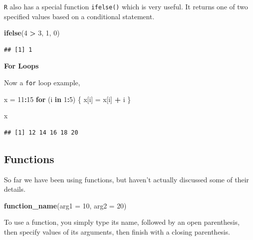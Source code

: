 \documentclass[]{book}
\newenvironment{Shaded}{\begin{snugshade}}{\end{snugshade}}
\newcommand{\KeywordTok}[1]{\textcolor[rgb]{0.13,0.29,0.53}{\textbf{#1}}}
\newcommand{\DataTypeTok}[1]{\textcolor[rgb]{0.13,0.29,0.53}{#1}}
\newcommand{\DecValTok}[1]{\textcolor[rgb]{0.00,0.00,0.81}{#1}}
\newcommand{\StringTok}[1]{\textcolor[rgb]{0.31,0.60,0.02}{#1}}
\newcommand{\ControlFlowTok}[1]{\textcolor[rgb]{0.13,0.29,0.53}{\textbf{#1}}}
\newcommand{\OperatorTok}[1]{\textcolor[rgb]{0.81,0.36,0.00}{\textbf{#1}}}
\newcommand{\NormalTok}[1]{#1}
\theoremstyle{definition}
\theoremstyle{definition}
\theoremstyle{definition}
\theoremstyle{remark}
\begin{document}
\texttt{R} also has a special function \texttt{ifelse()} which is very
useful. It returns one of two specified values based on a conditional
statement.

\begin{Shaded}
\begin{Highlighting}[]
\KeywordTok{ifelse}\NormalTok{(}\DecValTok{4} \OperatorTok{>}\StringTok{ }\DecValTok{3}\NormalTok{, }\DecValTok{1}\NormalTok{, }\DecValTok{0}\NormalTok{)}
\end{Highlighting}
\end{Shaded}

\begin{verbatim}
## [1] 1
\end{verbatim}

\textbf{For Loops}

Now a \texttt{for} loop example,

\begin{Shaded}
\begin{Highlighting}[]
\NormalTok{x =}\StringTok{ }\DecValTok{11}\OperatorTok{:}\DecValTok{15}
\ControlFlowTok{for}\NormalTok{ (i }\ControlFlowTok{in} \DecValTok{1}\OperatorTok{:}\DecValTok{5}\NormalTok{) \{}
\NormalTok{  x[i] =}\StringTok{ }\NormalTok{x[i] }\OperatorTok{+}\StringTok{ }\NormalTok{i}
\NormalTok{\}}

\NormalTok{x}
\end{Highlighting}
\end{Shaded}

\begin{verbatim}
## [1] 12 14 16 18 20
\end{verbatim}

\subsection{Functions}\label{functions}

So far we have been using functions, but haven't actually discussed some
of their details.

\begin{Shaded}
\begin{Highlighting}[]
\KeywordTok{function_name}\NormalTok{(}\DataTypeTok{arg1 =} \DecValTok{10}\NormalTok{, }\DataTypeTok{arg2 =} \DecValTok{20}\NormalTok{)}
\end{Highlighting}
\end{Shaded}

To use a function, you simply type its name, followed by an open
parenthesis, then specify values of its arguments, then finish with a
closing parenthesis.
\end{document}
